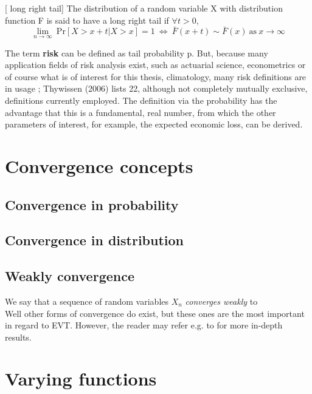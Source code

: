 \documentclass[11pt,a4paper,openany ]{book}
\begin{document}
[ long right tail] 
The distribution of a random variable X with distribution function F is said to have a long 
right tail if $\forall t > 0$,
\begin{equation}
\displaystyle{\lim_{n \to \infty}} \ \text{Pr}[X>x+t|X>x]=1 \ \Leftrightarrow \ 
\bar{F}(x+t)\sim\bar{F}(x) \ \text{as} \ x\to\infty
\end{equation}


The term \textbf{risk} can be defined as tail probability p. But, because many application 
fields of risk analysis exist, such as actuarial science, econometrics or of course what is 
of interest for this thesis, climatology, many risk definitions are in usage ; Thywissen 
(2006) lists 22, although
not completely mutually exclusive, definitions currently employed. The definition via the 
probability has the advantage that this is a fundamental, real number, from which the other 
parameters of interest, for example, the expected economic loss, can
be derived.



\section{Convergence concepts}\label{convconc}


\subsection*{Convergence in probability}


\subsection*{Convergence in distribution}



\subsection*{Weakly convergence} 
We say that a sequence of random variables $X_n$ \emph{converges weakly} to 
\\


Well other forms of convergence do exist, but these ones are the most important in regard to EVT. However, the reader may refer e.g. to \citet{lafaye_understanding_2009}  for more in-depth results.
\section{Varying functions}
\end{document}
